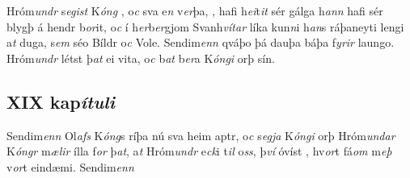 Hróm\textit{undr} s\textit{egist}  
  K\textit{óng} , o\textit{c} sva   e\textit{n} v\textit{er}þa,    , hafi   h\textit{ei}t\textit{it} sér gálga   h\textit{ann} hafi sér blygþ á hendr b\textit{or}it, o\textit{c}  í h\textit{er}b\textit{er}gjom  Svanh\textit{vítar} líka
kun\textit{n}i h\textit{an}s ráþaneyti lengi a\textit{t} duga, 
s\textit{em}  séo   Bíldr o\textit{c} Vole. Sendim\textit{enn} qváþo þá dauþa báþa
f\textit{yrir} laungo. Hróm\textit{undr} létst þ\textit{at} ei vita, o\textit{c}
b\textit{at}  b\textit{er}a  
 K\textit{óngi} orþ  sín. 
 \pend \endnumbering  
 \beginnumbering \pstart  
\vspace{5mm} \subsection*{XIX kap\textit{ítuli}}
 Sendim\textit{enn} Ol\textit{afs} K\textit{óng}s ríþa nú sva   heim aptr, o\textit{c} s\textit{egja} K\textit{óngi} orþ Hróm\textit{undar} K\textit{óngr} m\textit{ælir} ílla f\textit{or} þ\textit{at}, a\textit{t} Hróm\textit{undr}  e\textit{ck}i t\textit{il}   o\textit{ss},  þ\textit{ví}  óvíst  , 
 hv\textit{or}t   fá\textit{om}  m\textit{eþ} v\textit{or}t eindæmi. 
 Sendim\textit{enn}
